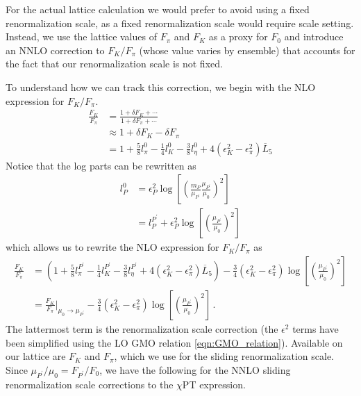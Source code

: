 \documentclass[prd,tightenlines,preprintnumbers,showpacs,superscriptaddress,notitlepage,eqsecnum,floatfix,notitlepage]{revtex4-1}
\begin{document}
For the actual  lattice calculation we would prefer to avoid using a fixed renormalization scale, as a fixed renormalization scale would require scale setting. Instead, we use the lattice values of $F_\pi$ and $F_K$ as a proxy for $F_0$ and introduce an NNLO correction to $F_K/F_\pi$ (whose value varies by ensemble) that accounts for the fact that our renormalization scale is not fixed. 

To understand how we can track this correction, we begin with the NLO expression for $F_K/F_\pi$.
\begin{align}
\frac{F_K}{F_\pi} &= \frac{1 + \delta F_K + \cdots}{1 + \delta F_\pi	 + \cdots} \nonumber \\
&\approx 1 + \delta F_K - \delta F_\pi \nonumber \\
&= 1 + \frac58 l^0_\pi - \frac14 l^0_K - \frac38 l^0_\eta +  4 \left( \epsilon^2_K - \epsilon^2_\pi 
\right) \overline L_5
\end{align}
Notice that the log  parts can be rewritten as
\begin{align}
l^0_P &= \epsilon_P^2 \log \left[ \left(\frac{m_P}{\mu_{P^\prime}}\frac{\mu_{P^\prime}}{\mu_0}\right)^2 \right] \nonumber \\
&= l^{P^\prime}_P + \epsilon_P^2 \log \left[ \left( \frac{\mu_{P^\prime}}{\mu_0} \right)^2 \right]
\end{align}
which allows us to rewrite the NLO expression for $F_K/F_\pi$ as
\begin{align}
\frac{F_K}{F_\pi}& =  \left(1 + \frac58 l^{P^\prime}_\pi - \frac14 l^{P^\prime}_K - \frac38 l^{P^\prime}_\eta +  4 \left( \epsilon^2_K - \epsilon^2_\pi 
\right) \overline L_5 \right)
- \frac 34 \left( \epsilon_K^2 -  \epsilon_\pi^2 \right) \log \left[ \left( \frac{\mu_{P^\prime}}{\mu_0} \right)^2 \right] \nonumber \\
&= \frac{F_K}{F_\pi} \Big\rvert_{\mu_0 \rightarrow \mu_{P^\prime}}
- \frac 34 \left( \epsilon_K^2 -  \epsilon_\pi^2 \right) \log \left[ \left( \frac{\mu_{P^\prime}}{\mu_0} \right)^2 \right] \, . 
\end{align}
The lattermost term is the renormalization scale correction (the $\epsilon^2$ terms have been simplified using the LO GMO relation \eqref{eqn:GMO_relation}). Available on our lattice are $F_K$ and $F_\pi$, which we use for the sliding renormalization scale. Since $\mu_{P^\prime}/\mu_0 = F_{P^\prime}/F_0 $, we have the following for the NNLO sliding renormalization scale corrections to the $\chi$PT  expression.
\end{document}
